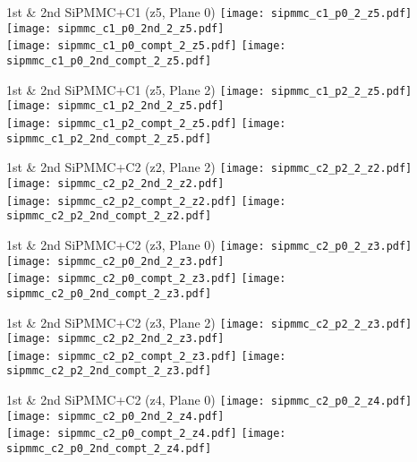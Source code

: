 \documentclass{beamer}
\begin{document}
\begin{frame}{1st \& 2nd SiPMMC+C1 (z5, Plane 0)}
	\texttt{[image: sipmmc\_c1\_p0\_2\_z5.pdf]}
	\texttt{[image: sipmmc\_c1\_p0\_2nd\_2\_z5.pdf]} \\
	
		\texttt{[image: sipmmc\_c1\_p0\_compt\_2\_z5.pdf]}
		\texttt{[image: sipmmc\_c1\_p0\_2nd\_compt\_2\_z5.pdf]}
\end{frame}

\begin{frame}{1st \& 2nd SiPMMC+C1 (z5, Plane 2)}
	\texttt{[image: sipmmc\_c1\_p2\_2\_z5.pdf]}
	\texttt{[image: sipmmc\_c1\_p2\_2nd\_2\_z5.pdf]} \\
	
		\texttt{[image: sipmmc\_c1\_p2\_compt\_2\_z5.pdf]}
		\texttt{[image: sipmmc\_c1\_p2\_2nd\_compt\_2\_z5.pdf]}
\end{frame}

\begin{frame}{1st \& 2nd SiPMMC+C2 (z2, Plane 2)}
	\texttt{[image: sipmmc\_c2\_p2\_2\_z2.pdf]}
	\texttt{[image: sipmmc\_c2\_p2\_2nd\_2\_z2.pdf]} \\
	
		\texttt{[image: sipmmc\_c2\_p2\_compt\_2\_z2.pdf]}
		\texttt{[image: sipmmc\_c2\_p2\_2nd\_compt\_2\_z2.pdf]}
\end{frame}

\begin{frame}{1st \& 2nd SiPMMC+C2 (z3, Plane 0)}
	\texttt{[image: sipmmc\_c2\_p0\_2\_z3.pdf]}
	\texttt{[image: sipmmc\_c2\_p0\_2nd\_2\_z3.pdf]} \\
	
		\texttt{[image: sipmmc\_c2\_p0\_compt\_2\_z3.pdf]}
		\texttt{[image: sipmmc\_c2\_p0\_2nd\_compt\_2\_z3.pdf]}
\end{frame}

\begin{frame}{1st \& 2nd SiPMMC+C2 (z3, Plane 2)}
	\texttt{[image: sipmmc\_c2\_p2\_2\_z3.pdf]}
	\texttt{[image: sipmmc\_c2\_p2\_2nd\_2\_z3.pdf]} \\
	
		\texttt{[image: sipmmc\_c2\_p2\_compt\_2\_z3.pdf]}
		\texttt{[image: sipmmc\_c2\_p2\_2nd\_compt\_2\_z3.pdf]}
\end{frame}

\begin{frame}{1st \& 2nd SiPMMC+C2 (z4, Plane 0)}
	\texttt{[image: sipmmc\_c2\_p0\_2\_z4.pdf]}
	\texttt{[image: sipmmc\_c2\_p0\_2nd\_2\_z4.pdf]} \\
	
		\texttt{[image: sipmmc\_c2\_p0\_compt\_2\_z4.pdf]}
		\texttt{[image: sipmmc\_c2\_p0\_2nd\_compt\_2\_z4.pdf]}
\end{frame}
\end{document}
